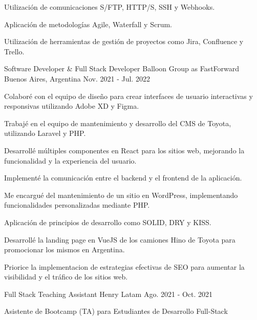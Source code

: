 \begin{cventries}
{\begin{cvitems}
        \item {Utilización de comunicaciones S/FTP, HTTP/S, SSH y Webhooks.}
        \item {Aplicación de metodologías Agile, Waterfall y Scrum.}
        \item {Utilización de herramientas de gestión de proyectos como Jira, Confluence y Trello.}
      \end{cvitems}
    }
  \vspace{5.5mm}
  \cventry
    {Software Developer \& Full Stack Developer} %
    {Balloon Group as FastForward} %
    {Buenos Aires, Argentina} %
    {Nov. 2021 - Jul. 2022} %
    {
      \begin{cvitems} %
        \item {Colaboré con el equipo de diseño para crear interfaces de usuario interactivas y responsivas utilizando Adobe XD y Figma.}
        \item {Trabajé en el equipo de mantenimiento y desarrollo del CMS de Toyota, utilizando Laravel y PHP.}
        \item {Desarrollé múltiples componentes en React para los sitios web, mejorando la funcionalidad y la experiencia del usuario.}
        \item {Implementé la comunicación entre el backend y el frontend de la aplicación.}
        \item {Me encargué del mantenimiento de un sitio en WordPress, implementando funcionalidades personalizadas mediante PHP.}
        \item {Aplicación de principios de desarrollo como SOLID, DRY y KISS.}
        \item {Desarrollé la landing page en VueJS de los camiones Hino de Toyota para promocionar los mismos en Argentina.}
        \item { Priorice la implementacion de estrategias efectivas de SEO para aumentar la visibilidad y el tráfico de los sitios web.}
      \end{cvitems}
    }
  \vspace{5.5mm}
  \cventry
    {Full Stack Teaching Assistant} %
    {Henry} %
    {Latam} %
    {Ago. 2021 - Oct. 2021} %
    {
      \begin{cvitems} %
        \item {Asistente de Bootcamp (TA) para Estudiantes de Desarrollo Full-Stack}

\end{cvitems}}
\end{cventries}
